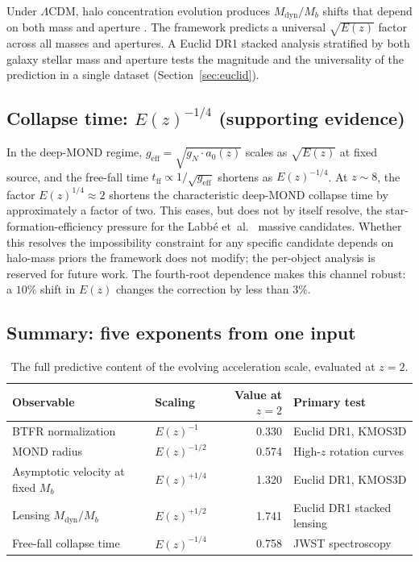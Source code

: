 \documentclass[11pt,a4paper]{article}
\numberwithin{equation}{section}
\numberwithin{table}{section}
\numberwithin{figure}{section}
\newcommand{\afid}{a_0}
\newcommand{\Mb}{M_b}
\newcommand{\Mdyn}{M_\text{dyn}}
\newcommand{\tff}{t_\text{ff}}
\newcommand{\geff}{g_\text{eff}}
\newcommand{\gN}{g_N}
\newcommand{\Ez}{E(z)}
\begin{document}
Under $\Lambda$CDM, halo concentration evolution produces $\Mdyn/\Mb$
shifts that depend on both mass and aperture
\citep{Moster2013,Duffy2008}. The framework predicts a universal
$\sqrt{\Ez}$ factor across all masses and apertures. A Euclid DR1
stacked analysis stratified by both galaxy stellar mass and aperture
tests the magnitude and the universality of the prediction in a single
dataset (Section~\ref{sec:euclid}).

\subsection{Collapse time: $\Ez^{-1/4}$ (supporting evidence)}
\label{sec:collapse}

In the deep-MOND regime, $\geff = \sqrt{\gN \cdot \afid(z)}$ scales as
$\sqrt{\Ez}$ at fixed source, and the free-fall time
$\tff \propto 1/\sqrt{\geff}$ shortens as $\Ez^{-1/4}$. At $z \sim 8$,
the factor $\Ez^{1/4} \approx 2$ shortens the characteristic deep-MOND
collapse time by approximately a factor of two. This eases, but does
not by itself resolve, the star-formation-efficiency pressure for the
Labb{\'e} et~al.\ \citep{Labbe2023} massive candidates. Whether this resolves the
impossibility constraint for any specific candidate depends on
halo-mass priors the framework does not modify; the per-object analysis
is reserved for future work. The fourth-root dependence makes this
channel robust: a $10\%$ shift in $\Ez$ changes the correction by less
than $3\%$.

\subsection{Summary: five exponents from one input}
\label{sec:five-exponents}

\begin{table}[!ht]
\centering
\caption{The full predictive content of the evolving acceleration
scale, evaluated at $z = 2$.}
\label{tab:five-exponents}
\small
\setlength{\tabcolsep}{4pt}
\begin{tabular}{l l r l}
\toprule
Observable & Scaling & Value at $z = 2$ & Primary test \\
\midrule
BTFR normalization                 & $\Ez^{-1}$    & 0.330 & Euclid DR1, KMOS3D \\
MOND radius                         & $\Ez^{-1/2}$  & 0.574 & High-$z$ rotation curves \\
Asymptotic velocity at fixed $\Mb$ & $\Ez^{+1/4}$  & 1.320 & Euclid DR1, KMOS3D \\
Lensing $\Mdyn/\Mb$                & $\Ez^{+1/2}$  & 1.741 & Euclid DR1 stacked lensing \\
Free-fall collapse time             & $\Ez^{-1/4}$  & 0.758 & JWST spectroscopy \\
\bottomrule
\end{tabular}
\end{table}
\end{document}
